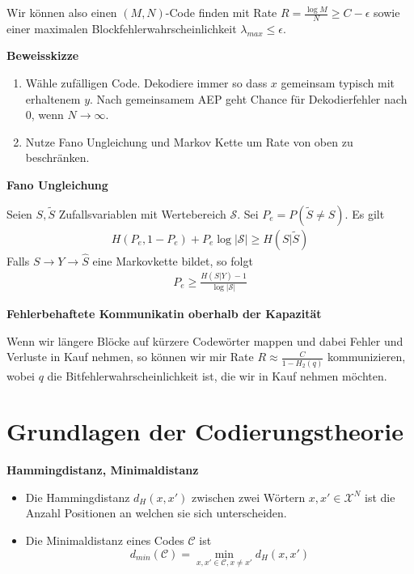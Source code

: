 \documentclass[25pt]{sciposter}
\renewcommand{\hat}{\widehat}
\newenvironment{defn}[1]{\begin{mdframed}[backgroundcolor=blue!10,innertopmargin=15pt, nobreak=true,innerbottommargin=15pt]
		\textbf{#1 }
	}
	{ 
	\end{mdframed}
}
\newenvironment{thm}[1]{\begin{mdframed}[nobreak=true,backgroundcolor=Emerald!10,innertopmargin=15pt, innerbottommargin=15pt]
		\textbf{#1 }
	}
	{ 
	\end{mdframed}
}
\begin{document}
\begin{multicols}{3}
Wir können also einen $(M,N)$-Code finden mit Rate $R = \frac{\log M }{N} \geq C-\epsilon$ sowie einer maximalen Blockfehlerwahrscheinlichkeit $\lambda_{max}\leq \epsilon$.

\textbf{Beweisskizze}
\begin{enumerate}
\item Wähle zufälligen Code. Dekodiere immer so dass $x$ gemeinsam typisch mit erhaltenem $y$. Nach gemeinsamem AEP geht Chance für Dekodierfehler nach 0, wenn $N \to \infty$.
\item Nutze Fano Ungleichung und Markov Kette um Rate von oben zu beschränken.
\end{enumerate}

\begin{thm}{Fano Ungleichung}
	Seien $S,\tilde{S}$ Zufallsvariablen mit Wertebereich $\mathcal{S}$. Sei $P_e = P(\tilde{S} \neq S)$. Es gilt
	\begin{align*}
		H(P_e,1-P_e) + P_e \log|\mathcal{S}| \geq H(S|\tilde{S})
	\end{align*}
	Falls $S\to Y \to \hat{S}$ eine Markovkette bildet, so folgt
	\begin{align*}
		P_e \geq \frac{H(S|Y) - 1}{\log |\mathcal{S}|}
	\end{align*}
\end{thm}



\textbf{Fehlerbehaftete Kommunikatin oberhalb der Kapazität}

Wenn wir längere Blöcke auf kürzere Codewörter mappen und dabei Fehler und Verluste in Kauf nehmen, so können wir mir Rate $R\approx \frac{C}{1-H_2(q)}$ kommunizieren, wobei $q$ die Bitfehlerwahrscheinlichkeit ist, die wir in Kauf nehmen möchten.


\section{Grundlagen der Codierungstheorie}


\begin{defn}{Hammingdistanz, Minimaldistanz}
	\begin{itemize}
		\item Die Hammingdistanz $d_H(x,x')$ zwischen zwei Wörtern $x,x'\in\mathcal{X}^N$ ist die Anzahl Positionen an welchen sie sich unterscheiden.
		\item Die Minimaldistanz eines Codes $\mathcal{C}$ ist $$d_{min}(\mathcal{C}) =\min_{x,x'\in \mathcal{C}, x\neq x'} d_H(x,x')$$
	\end{itemize}
\end{defn}



\end{multicols}
\end{document}
